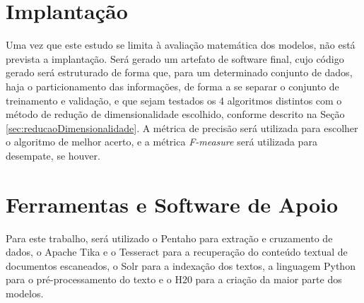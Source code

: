 \section{Implantação} 

Uma vez que este estudo se limita à avaliação matemática dos modelos, não está prevista a implantação. Será gerado um artefato de software final, cujo código gerado será estruturado de forma que, para um determinado conjunto de dados, haja o particionamento das informações, de forma a se separar o conjunto de treinamento e validação, e que sejam testados os 4 algoritmos distintos com o método de redução de dimensionalidade escolhido, conforme descrito na Seção \ref{sec:reducaoDimensionalidade}. A métrica de precisão será utilizada para escolher o algoritmo de melhor acerto, e a métrica \textit{F-measure} será utilizada para desempate, se houver.



\section{Ferramentas e Software de Apoio}%

Para este trabalho, será utilizado o Pentaho para extração e cruzamento de dados, o Apache Tika e o Tesseract para a recuperação do conteúdo textual de documentos escaneados, o Solr para a indexação dos textos, a linguagem Python para o pré-processamento do texto e o H20 para a criação da maior parte dos modelos. 


